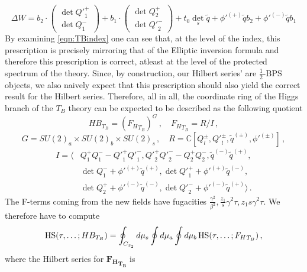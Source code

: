 \documentclass[main.tex]{subfiles}
\begin{document}
\begin{equation}\label{eqn:DeltaWB}
\Delta W=b_{2}\cdot\begin{pmatrix}\det {Q'}_1^+\\\det Q_1^-\end{pmatrix}+b_{1}\cdot\begin{pmatrix}\det Q_2^+\\\det {Q'}_2^-\end{pmatrix}+t_0\det_s  \widetilde{q}+{\phi'}^{(+)}\widetilde{q}b_{2}+{\phi'}^{(-)}\widetilde{q}b_{1}
\end{equation}
By examining \eqref{eqn:TBindex} one can see that, at the level of the index, this prescription is precisely mirroring that of the Elliptic inversion formula and therefore this prescription is correct, atleast at the level of the protected spectrum of the theory. Since, by construction, our Hilbert series' are $\frac{1}{2}$-BPS objects, we also naively expect that this prescription should also yield the correct result for the Hilbert series. 
Therefore, all in all, the coordinate ring of the Higgs branch of the $T_B$ theory can be expected to be described as the following quotient
\begin{equation}
HB_{T_B}=({F_H}_{T_B})^G\,,\quad {F_H}_{T_B}=R/I\,,
\end{equation}
\begin{equation}
G=SU(2)_{a}\times SU(2)_{b}\times SU(2)_s\,,\quad R=\mathbb{C}[Q_{l}^{\pm},{Q'}_{l}^{\pm},\widetilde{q}^{(\pm)},{\phi'}^{(\pm)}]\,,
\end{equation}
\begin{equation}
\begin{aligned}I=\langle& Q_1^+Q_1^--{Q'}_1^+{Q'}_1^-,{Q'}_2^+{Q'}_2^--Q_2^+Q_2^-,\widetilde{q}^{(-)}\widetilde{q}^{(+)},\\
&\det Q_1^-+{\phi'}^{(+)}\widetilde{q}^{(+)},\det {Q'}_1^++{\phi'}^{(+)}\widetilde{q}^{(-)},\\
&\det Q_2^++{\phi'}^{(-)}\widetilde{q}^{(-)},\det {Q'}_2^-+{\phi'}^{(-)}\widetilde{q}^{(+)}\rangle\,. 
\end{aligned}
\end{equation}
The F-terms coming from the new fields have fugacities $\frac{\gamma^2}{\beta^2},\frac{z_1}{s}\gamma^2\tau,z_1s\gamma^2\tau$. We therefore have to compute
\begin{equation}
\textrm{HS}(\tau,\dots;HB_{T_B})=\oint_{C_{z_2}} d\mu_{s}\oint d\mu_{a}\oint d\mu_{b}\,\textrm{HS}(\tau,\dots;{F_H}_{T_B})\,,
\end{equation}
where the Hilbert series for $\mathbf{{F_H}_{T_B}}$ is
\end{document}
